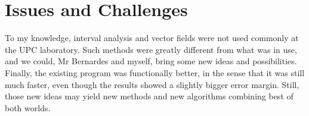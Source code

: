 \section{Issues and Challenges}

To my knowledge, interval analysis and vector fields were not used commonly at the UPC laboratory. 
Such methods were greatly different from what was in use, and we could, Mr Bernardes and myself, bring some new ideas and possibilities.
Finally, the existing program was functionally better, in the sense that it was still much faster, even though the results showed a slightly bigger error margin.
Still, those new ideas may yield new methods and new algorithms combining best of both worlds.
